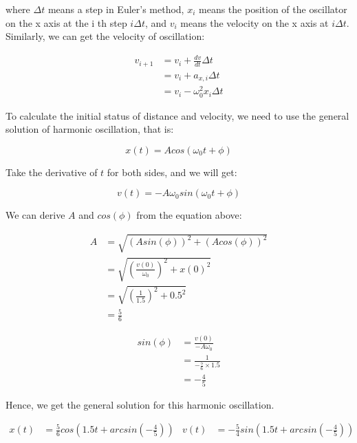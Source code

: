 \documentclass[12pt]{article}
\begin{document}
where $\Delta t$ means a step in Euler's method, $x_{i}$ means the position of the oscillator on the x axis at the i th step $i \Delta t$, and $v_{i}$ means the velocity on the x axis at $i \Delta t$. \\

Similarly, we can get the velocity of oscillation: 

\begin{align}
    v_{i+1} &= v_{i} + \frac{dv}{dt} \Delta t \\
            &= v_{i} + a_{x,i} \Delta t \nonumber \\
            &= v_{i} - \omega_{0}^2 x_{i} \Delta t \nonumber 
\end{align}

To calculate the initial status of distance and velocity, we need to use the general solution of harmonic oscillation, that is: 

\begin{equation}
    x(t) = A cos( \omega_{0} t + \phi )
\end{equation}

Take the derivative of $t$ for both sides, and we will get: 

\begin{equation}
    v(t) = -A \omega_{0} sin( \omega_{0} t + \phi )
\end{equation}

We can derive $A$ and $cos(\phi)$ from the equation above: 

\begin{align}
    A &= \sqrt{(A sin(\phi))^2 + (A cos(\phi))^2} \\
      &= \sqrt{\left( \frac{v(0)}{\omega_{0}} \right)^2 + x(0)^2} \nonumber \\
      &= \sqrt{\left( \frac{1}{1.5} \right)^2 + 0.5^2} \nonumber \\
      &= \frac{5}{6} \nonumber 
\end{align}

\begin{align}
    sin(\phi) &= \frac{v(0)}{-A \omega_{0}} \\
              &= \frac{1}{-\frac{5}{6} \times 1.5} \nonumber \\
              &= -\frac{4}{5} \nonumber
\end{align}

Hence, we get the general solution for this harmonic oscillation. 

\begin{align}
    x(t) &= \frac{5}{6} cos( 1.5 t + arcsin(-\frac{4}{5}) ) & 
    v(t) &= -\frac{5}{4} sin( 1.5 t + arcsin(-\frac{4}{5}) )
\end{align}
\end{document}
